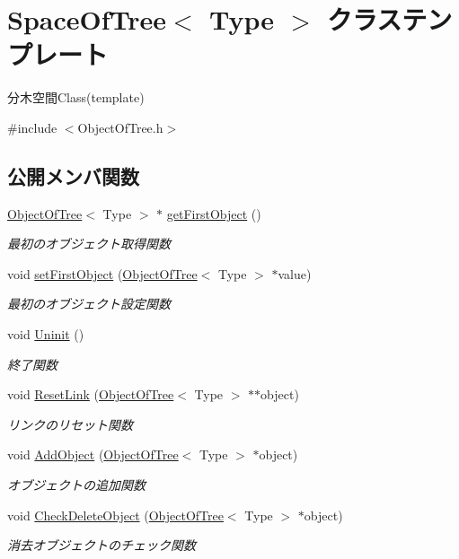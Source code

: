 \hypertarget{class_space_of_tree}{}\section{Space\+Of\+Tree$<$ Type $>$ クラステンプレート}
\label{class_space_of_tree}


分木空間\+Class(template)  




{\ttfamily \#include $<$Object\+Of\+Tree.\+h$>$}

\subsection*{公開メンバ関数}
\begin{DoxyCompactItemize}
\item 
\mbox{\hyperlink{class_object_of_tree}{Object\+Of\+Tree}}$<$ Type $>$ $\ast$ \mbox{\hyperlink{class_space_of_tree_a97ee8bf10b8d88d49e61875c88608b15}{get\+First\+Object}} ()
\begin{DoxyCompactList}\small\item\em 最初のオブジェクト取得関数 \end{DoxyCompactList}\item 
void \mbox{\hyperlink{class_space_of_tree_a43844bf7bfbf0d021b9ae4708cb2e6f4}{set\+First\+Object}} (\mbox{\hyperlink{class_object_of_tree}{Object\+Of\+Tree}}$<$ Type $>$ $\ast$value)
\begin{DoxyCompactList}\small\item\em 最初のオブジェクト設定関数 \end{DoxyCompactList}\item 
void \mbox{\hyperlink{class_space_of_tree_a8f7238becd1df9192e5f5ddc442b7ee3}{Uninit}} ()
\begin{DoxyCompactList}\small\item\em 終了関数 \end{DoxyCompactList}\item 
void \mbox{\hyperlink{class_space_of_tree_a3231408434cb3066768cfd9d33d86190}{Reset\+Link}} (\mbox{\hyperlink{class_object_of_tree}{Object\+Of\+Tree}}$<$ Type $>$ $\ast$$\ast$object)
\begin{DoxyCompactList}\small\item\em リンクのリセット関数 \end{DoxyCompactList}\item 
void \mbox{\hyperlink{class_space_of_tree_a8156722056d7b2ab354ff22235772d7e}{Add\+Object}} (\mbox{\hyperlink{class_object_of_tree}{Object\+Of\+Tree}}$<$ Type $>$ $\ast$object)
\begin{DoxyCompactList}\small\item\em オブジェクトの追加関数 \end{DoxyCompactList}\item 
void \mbox{\hyperlink{class_space_of_tree_a746aef6b3bafdde17daa5125cc9bc43c}{Check\+Delete\+Object}} (\mbox{\hyperlink{class_object_of_tree}{Object\+Of\+Tree}}$<$ Type $>$ $\ast$object)
\begin{DoxyCompactList}\small\item\em 消去オブジェクトのチェック関数 \end{DoxyCompactList}\end{DoxyCompactItemize}
